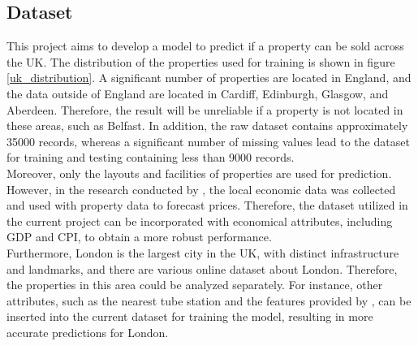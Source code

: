 \documentclass[12pt,twoside]{report}
\begin{document}
\subsection{Dataset}
This project aims to develop a model to predict if a property can be sold across the UK. The distribution of the properties used for training is shown in figure \ref{uk_distribution}. A significant number of properties are located in England, and the data outside of England are located in Cardiff, Edinburgh, Glasgow, and Aberdeen. Therefore, the result will be unreliable if a property is not located in these areas, such as Belfast. In addition, the raw dataset contains approximately 35000 records, whereas a significant number of missing values lead to the dataset for training and testing containing less than 9000 records.
\\

Moreover, only the layouts and facilities of properties are used for prediction. However, in the research conducted by \citet{RN20}, the local economic data was collected and used with property data to forecast prices. Therefore, the dataset utilized in the current project can be incorporated with economical attributes, including GDP and CPI, to obtain a more robust performance. 
\\

Furthermore, London is the largest city in the UK, with distinct infrastructure and landmarks, and there are various online dataset about London. Therefore, the properties in this area could be analyzed separately. For instance, other attributes, such as the nearest tube station and the features provided by \citet{RN26}, can be inserted into the current dataset for training the model, resulting in more accurate predictions for London. 
\end{document}
